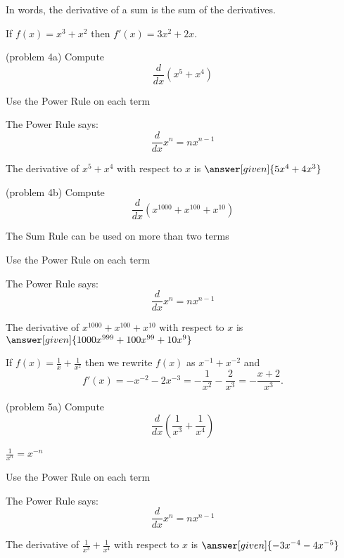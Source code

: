 \documentclass{ximera}
\begin{document}
In words, the derivative of a sum is the sum of the derivatives.


\begin{example}[example 4]
If $f(x) = x^3 + x^2$ then $f'(x) = 3x^2 + 2x$.
\end{example}

\begin{problem}(problem 4a)
  Compute 
  \[
  \frac{d}{dx} (x^5 + x^4)
  \]
  
    \begin{hint}
      Use the Power Rule on each term
    \end{hint}
    \begin{hint}
      The Power Rule says:
      \[
      \frac{d}{dx} x^n = nx^{n-1}
      \]
    \end{hint}    
		The derivative of $x^5 + x^4$ with respect to $x$ is
		 $\answer[given]{5x^4 + 4x^3}$
	
\end{problem}

\begin{problem}(problem 4b)
  Compute 
  \[
  \frac{d}{dx} (x^{1000} + x^{100} + x^{10})
  \]
  
    \begin{hint}
		  The Sum Rule can be used on more than two terms
		\end{hint}
		\begin{hint}
      Use the Power Rule on each term
    \end{hint}
    \begin{hint}
      The Power Rule says:
      \[
      \frac{d}{dx} x^n = nx^{n-1}
      \]
    \end{hint}    
		The derivative of $x^{1000} + x^{100} + x^{10}$ with respect to $x$ is
		 $\answer[given]{1000x^{999} + 100x^{99} + 10x^9}$
	
\end{problem}

\begin{example}[example 5]
 If $f(x) = \frac{1}{x} + \frac{1}{x^2}$ then we rewrite $f(x)$ as $x^{-1} + x^{-2}$ and 
\[f'(x) = -x^{-2} -2x^{-3} = -\frac{1}{x^2} - \frac{2}{x^3} = - \frac{x + 2}{x^3}.\]
\end{example}

\begin{problem}(problem 5a)
  Compute 
  \[
  \frac{d}{dx} \left(\frac{1}{x^3} + \frac{1}{x^4}\right)
  \]
  
    \begin{hint}
		 $\frac{1}{x^n} = x^{-n}$
		\end{hint}
		\begin{hint}
      Use the Power Rule on each term
    \end{hint}
    \begin{hint}
      The Power Rule says:
      \[
      \frac{d}{dx} x^n = nx^{n-1}
      \]
    \end{hint}    
		The derivative of $\frac{1}{x^3} + \frac{1}{x^4}$ with respect to $x$ is
		 $\answer[given]{-3x^{-4} -4x^{-5}}$
	
\end{problem}
\end{document}

